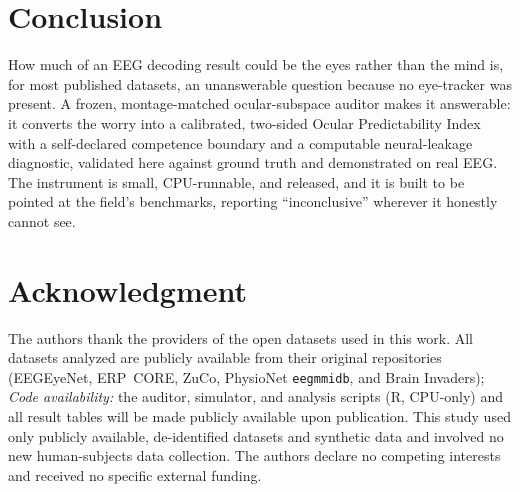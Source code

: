 \documentclass[conference]{IEEEtran}
\begin{document}
\section{Conclusion}

How much of an EEG decoding result could be the eyes rather than the mind is, for most published
datasets, an unanswerable question because no eye-tracker was present. A frozen, montage-matched
ocular-subspace auditor makes it answerable: it converts the worry into a calibrated, two-sided
Ocular Predictability Index with a self-declared competence boundary and a computable
neural-leakage diagnostic, validated here against ground truth and demonstrated on real EEG. The
instrument is small, CPU-runnable, and released, and it is built to be pointed at the field's
benchmarks, reporting ``inconclusive'' wherever it honestly cannot see.

\section*{Acknowledgment}

The authors thank the providers of the open datasets used in this work. All datasets analyzed are
publicly available from their original repositories (EEGEyeNet, ERP~CORE, ZuCo, PhysioNet
\texttt{eegmmidb}, and Brain Invaders); \emph{Code availability:} the auditor, simulator, and analysis scripts (R, CPU-only) and all
result tables will be made publicly available upon publication. This study used only publicly available,
de-identified datasets and synthetic data and involved no new human-subjects data collection. The
authors declare no competing interests and received no specific external funding.
\end{document}

